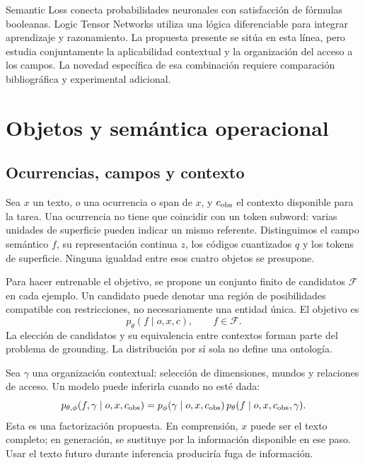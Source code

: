 \documentclass[11pt,a4paper]{article}
\begin{document}
Semantic Loss conecta probabilidades neuronales con satisfacción de fórmulas
booleanas\cite{semanticloss}. Logic Tensor Networks utiliza una lógica
diferenciable para integrar aprendizaje y razonamiento\cite{ltn}. La propuesta
presente se sitúa en esta línea, pero estudia conjuntamente la aplicabilidad
contextual y la organización del acceso a los campos. La novedad específica de
esa combinación requiere comparación bibliográfica y experimental adicional.

\section{Objetos y semántica operacional}
\subsection{Ocurrencias, campos y contexto}
Sea $x$ un texto, $o$ una ocurrencia o span de $x$, y $c_{\rm obs}$ el contexto
disponible para la tarea. Una ocurrencia no tiene que coincidir con un token
subword: varias unidades de superficie pueden indicar un mismo referente.
Distinguimos el campo semántico $f$, su representación continua $z$, los códigos
cuantizados $q$ y los tokens de superficie. Ninguna igualdad entre esos cuatro
objetos se presupone.

Para hacer entrenable el objetivo, se propone un conjunto finito de candidatos
$\mathcal{F}$ en cada ejemplo. Un candidato puede denotar una región de
posibilidades compatible con restricciones, no necesariamente una entidad única.
El objetivo es
\begin{equation}
 p_\theta(f\mid o,x,c), \qquad f\in\mathcal{F}.
\end{equation}
La elección de candidatos y su equivalencia entre contextos forman parte del
problema de grounding. La distribución por sí sola no define una ontología.

Sea $\gamma$ una organización contextual: selección de dimensiones, mundos y
relaciones de acceso. Un modelo puede inferirla cuando no esté dada:
\begin{equation}\label{eq:joint}
 p_{\theta,\phi}(f,\gamma\mid o,x,c_{\rm obs})=
 p_\phi(\gamma\mid o,x,c_{\rm obs})\,
 p_\theta(f\mid o,x,c_{\rm obs},\gamma).
\end{equation}
Esta es una factorización propuesta. En comprensión, $x$ puede ser el texto
completo; en generación, se sustituye por la información disponible en ese
paso. Usar el texto futuro durante inferencia produciría fuga de información.
\end{document}
